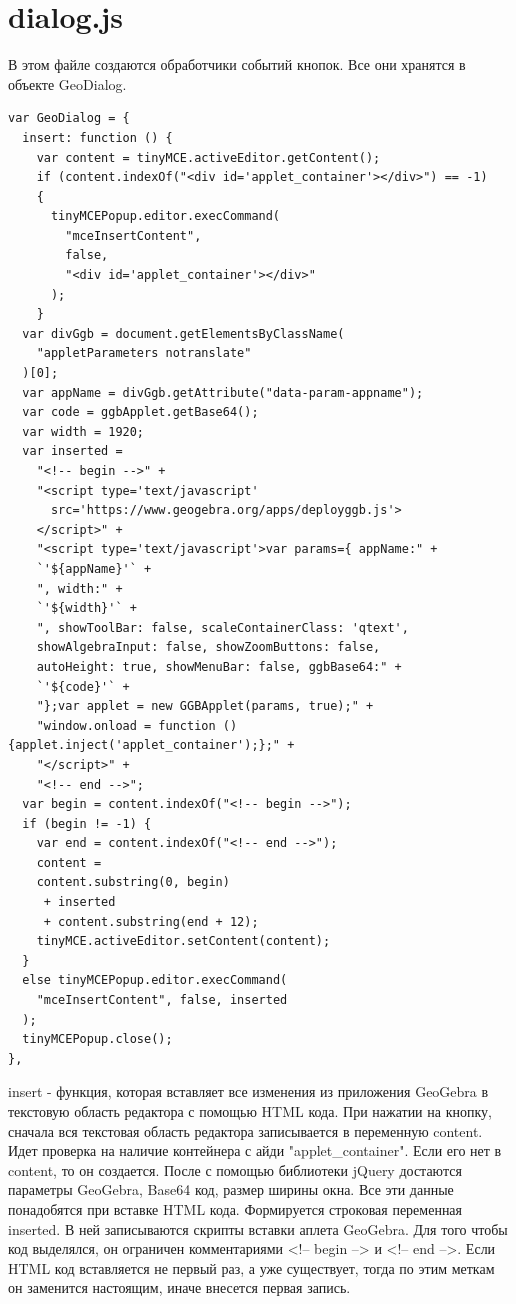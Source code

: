 \documentclass[14pt,Diplom]{diplomwork}
\begin{document}
\section{dialog.js}
В этом файле создаются обработчики событий кнопок. Все они хранятся в объекте GeoDialog.
\begin{verbatim}
var GeoDialog = {
  insert: function () {
    var content = tinyMCE.activeEditor.getContent();
    if (content.indexOf("<div id='applet_container'></div>") == -1) 
    {
      tinyMCEPopup.editor.execCommand(
        "mceInsertContent",
        false,
        "<div id='applet_container'></div>"
      );
    }
  var divGgb = document.getElementsByClassName(
    "appletParameters notranslate"
  )[0];
  var appName = divGgb.getAttribute("data-param-appname");
  var code = ggbApplet.getBase64();
  var width = 1920;
  var inserted =
    "<!-- begin -->" +
    "<script type='text/javascript' 
      src='https://www.geogebra.org/apps/deployggb.js'>
    </script>" +
    "<script type='text/javascript'>var params={ appName:" +
    `'${appName}'` +
    ", width:" +
    `'${width}'` +
    ", showToolBar: false, scaleContainerClass: 'qtext',
    showAlgebraInput: false, showZoomButtons: false, 
    autoHeight: true, showMenuBar: false, ggbBase64:" +
    `'${code}'` +
    "};var applet = new GGBApplet(params, true);" +
    "window.onload = function () {applet.inject('applet_container');};" +
    "</script>" +
    "<!-- end -->";
  var begin = content.indexOf("<!-- begin -->");
  if (begin != -1) {
    var end = content.indexOf("<!-- end -->");
    content =
    content.substring(0, begin)
     + inserted 
     + content.substring(end + 12);
    tinyMCE.activeEditor.setContent(content);
  } 
  else tinyMCEPopup.editor.execCommand(
    "mceInsertContent", false, inserted
  );
  tinyMCEPopup.close();
},
\end{verbatim}
insert - функция, которая вставляет все изменения из приложения GeoGebra в текстовую область редактора с помощью HTML кода. При нажатии на кнопку, сначала вся текстовая область редактора записывается в переменную content. Идет проверка на наличие контейнера с айди "applet\_container". Если его нет в content, то он создается. После с помощью библиотеки jQuery достаются параметры GeoGebra, Base64 код, размер ширины окна. Все эти данные понадобятся при вставке HTML кода. Формируется строковая переменная inserted. В ней записываются скрипты вставки аплета GeoGebra. Для того чтобы код выделялся, он ограничен комментариями <!-- begin --> и <!-- end -->. Если HTML код вставляется не первый раз, а уже существует, тогда по этим меткам он заменится настоящим, иначе внесется первая запись.
\end{document}
